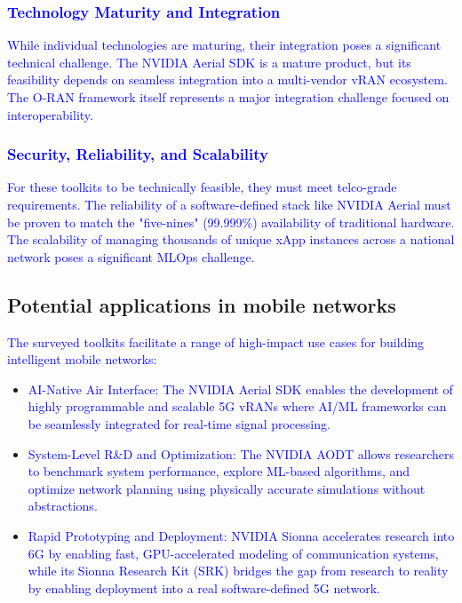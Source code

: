 \documentclass[conference]{IEEEtran}
\begin{document}
\textcolor{blue}{\subsubsection{Technology Maturity and Integration}
While individual technologies are maturing, their integration poses a significant technical challenge. The NVIDIA Aerial SDK is a mature product, but its feasibility depends on seamless integration into a multi-vendor vRAN ecosystem. The O-RAN framework itself represents a major integration challenge focused on interoperability.}

\textcolor{blue}{\subsubsection{Security, Reliability, and Scalability}
For these toolkits to be technically feasible, they must meet telco-grade requirements. The reliability of a software-defined stack like NVIDIA Aerial must be proven to match the "five-nines" (99.999\%) availability of traditional hardware. The scalability of managing thousands of unique xApp instances across a national network poses a significant MLOps challenge.}

\subsection{Potential applications in mobile networks}
\textcolor{blue}{The surveyed toolkits facilitate a range of high-impact use cases for building intelligent mobile networks:}

\begin{itemize}
\item \textcolor{blue}{AI-Native Air Interface: The NVIDIA Aerial SDK enables the development of highly programmable and scalable 5G vRANs where AI/ML frameworks can be seamlessly integrated for real-time signal processing.}

\item \textcolor{blue}{System-Level R\&D and Optimization: The NVIDIA AODT allows researchers to benchmark system performance, explore ML-based algorithms, and optimize network planning using physically accurate simulations without abstractions.}

\item \textcolor{blue}{Rapid Prototyping and Deployment: NVIDIA Sionna accelerates research into 6G by enabling fast, GPU-accelerated modeling of communication systems, while its Sionna Research Kit (SRK) bridges the gap from research to reality by enabling deployment into a real software-defined 5G network.}
\end{itemize}
\end{document}

